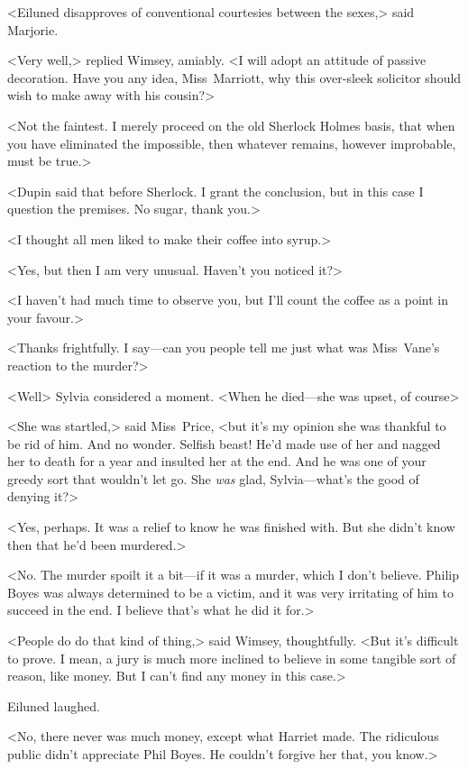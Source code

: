 <Eiluned disapproves of conventional courtesies between the sexes,> said Marjorie.

<Very well,> replied Wimsey, amiably. <I will adopt an attitude of passive decoration. Have you any idea, Miss~Marriott, why this over-sleek solicitor should wish to make away with his cousin?>

<Not the faintest. I merely proceed on the old Sherlock Holmes basis, that when you have eliminated the impossible, then whatever remains, however improbable, must be true.>

<Dupin said that before Sherlock. I grant the conclusion, but in this case I question the premises. No sugar, thank you.>

<I thought all men liked to make their coffee into syrup.>

<Yes, but then I am very unusual. Haven't you noticed it?>

<I haven't had much time to observe you, but I'll count the coffee as a point in your favour.>

<Thanks frightfully. I say—can you people tell me just what was Miss~Vane's reaction to the murder?>

<Well\longdash> Sylvia considered a moment. <When he died—she was upset, of course\longdash>

<She was startled,> said Miss~Price, <but it's my opinion she was thankful to be rid of him. And no wonder. Selfish beast! He'd made use of her and nagged her to death for a year and insulted her at the end. And he was one of your greedy sort that wouldn't let go. She \emph{was} glad, Sylvia—what's the good of denying it?>

<Yes, perhaps. It was a relief to know he was finished with. But she didn't know then that he'd been murdered.>

<No. The murder spoilt it a bit—if it was a murder, which I don't believe. Philip Boyes was always determined to be a victim, and it was very irritating of him to succeed in the end. I believe that's what he did it for.>

<People do do that kind of thing,> said Wimsey, thoughtfully. <But it's difficult to prove. I mean, a jury is much more inclined to believe in some tangible sort of reason, like money. But I can't find any money in this case.>

Eiluned laughed.

<No, there never was much money, except what Harriet made. The ridiculous public didn't appreciate Phil Boyes. He couldn't forgive her that, you know.>

